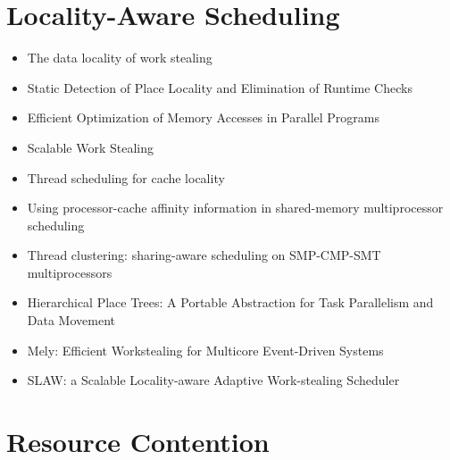 \section*{Locality-Aware Scheduling}
\label{sec:lr-locality-aware-scheduling}

\begin{itemize}
\item The data locality of work stealing \cite{Acar2002}
\item Static Detection of Place Locality and Elimination of Runtime
  Checks \cite{Agarwal2008}
\item Efficient Optimization of Memory Accesses in Parallel Programs
  \cite{Barik2009}
\item Scalable Work Stealing \cite{Dinan2009}
\item Thread scheduling for cache locality \cite{Philbin1996}
\item Using processor-cache affinity information in shared-memory
  multiprocessor scheduling \cite{Squillante1993}
\item Thread clustering: sharing-aware scheduling on SMP-CMP-SMT
  multiprocessors \cite{Tam2007}
\item Hierarchical Place Trees: A Portable Abstraction for Task
  Parallelism and Data Movement \cite{Yan2009}
\item Mely: Efficient Workstealing for Multicore Event-Driven Systems
  \cite{Gaud2010}
\item SLAW: a Scalable Locality-aware Adaptive Work-stealing Scheduler
  \cite{Guo2010}
\end{itemize}


\section*{Resource Contention}
\label{sec:lr-resource-contention}

